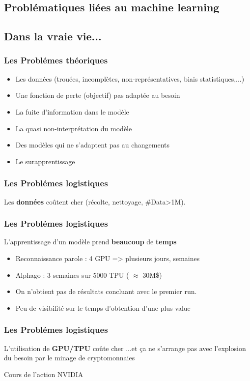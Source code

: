 \subsection{Problématiques liées au machine learning}
\subsection{Dans la vraie vie...}

\begin{frame}
  \frametitle{Les Problémes théoriques}
  \begin{itemize}
  \item Les données (trouées, incomplètes, non-représentatives, biais statistiques,...)
  \item Une fonction de perte (objectif) pas adaptée au besoin
  \item La fuite d'information dans le modèle
  \item La quasi non-interprétation du modèle
  \item Des modèles qui ne s'adaptent pas au changements
  \item Le surapprentissage
  \end{itemize}
\end{frame}

\begin{frame}
  \frametitle{Les Problémes logistiques}
  Les \textbf{données} coûtent cher (récolte, nettoyage, \#Data>1M). 
\end{frame}

\begin{frame}
  \frametitle{Les Problémes logistiques}
  L'apprentissage d'un modèle prend \textbf{beaucoup} de \textbf{temps}
  \begin{itemize}
  \item Reconnaissance parole : 4 GPU => plusieurs jours, semaines
  \item Alphago : 3 semaines sur 5000 TPU ( $\approx$ 30M\$)
  \item On n'obtient pas de résultats concluant avec le premier run.
  \item Peu de visibilité sur le temps d'obtention d'une plus value
  \end{itemize}
\end{frame}

\begin{frame}
  \frametitle{Les Problémes logistiques}
  L'utilisation de \textbf{GPU/TPU} coûte cher
  \newline
  ...et ça ne s'arrange pas avec l'explosion du besoin par le minage de cryptomonnaies
  \begin{center}
    \small Cours de l'action NVIDIA
  \end{center}
\end{frame}


